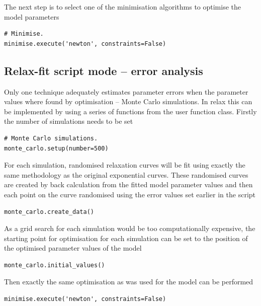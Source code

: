 The next step is to select one of the minimisation algorithms to optimise the model parameters

\begin{lstlisting}[firstnumber=65]
# Minimise.
minimise.execute('newton', constraints=False)
\end{lstlisting}




\subsection{Relax-fit script mode -- error analysis}

Only one technique adequately estimates parameter errors when the parameter values where found by optimisation -- Monte Carlo simulations.
In relax this can be implemented by using a series of functions from the  user function class.
Firstly the number of simulations needs to be set

\begin{lstlisting}[firstnumber=68]
# Monte Carlo simulations.
monte_carlo.setup(number=500)
\end{lstlisting}

For each simulation, randomised relaxation curves will be fit using exactly the same methodology as the original exponential curves.
These randomised curves are created by back calculation from the fitted model parameter values and then each point on the curve randomised using the error values set earlier in the script

\begin{lstlisting}[firstnumber=70]
monte_carlo.create_data()
\end{lstlisting}

As a grid search for each simulation would be too computationally expensive, the starting point for optimisation for each simulation can be set to the position of the optimised parameter values of the model

\begin{lstlisting}[firstnumber=71]
monte_carlo.initial_values()
\end{lstlisting}

Then exactly the same optimisation as was used for the model can be performed

\begin{lstlisting}[firstnumber=72]
minimise.execute('newton', constraints=False)
\end{lstlisting}

